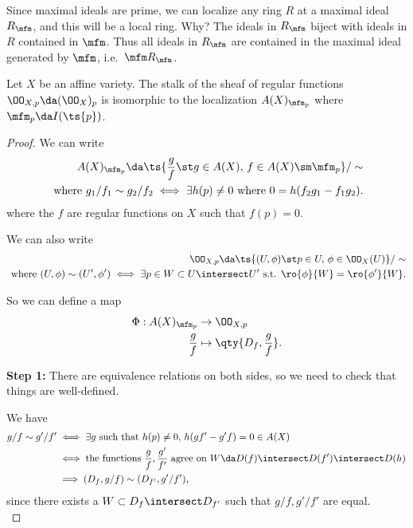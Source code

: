 Since maximal ideals are prime, we can localize any ring \(R\) at a
maximal ideal \(R_\mfm\), and this will be a local ring. Why? The ideals
in \(R_\mfm\) biject with ideals in \(R\) contained in \(\mfm\). Thus
all ideals in \(R_\mfm\) are contained in the maximal ideal generated by
\(\mfm\), i.e.~\(\mfm R_\mfm\).

\begin{lemma}[?]

Let \(X\) be an affine variety. The stalk of the sheaf of regular
functions \(\OO_{X, p} \da (\OO_X)_p\) is isomorphic to the localization
\(A(X)_{\mfm_p}\) where \(\mfm_p \da I(\ts{p})\).

\end{lemma}

\begin{proof}

We can write
\begin{align*}  
A(X)_{\mfm_p} \da \ts{{g\over f} \st g\in A(X),\, f\in A(X)\sm \mfm_p} / \sim \\
\text{ where } g_1/f_1 \sim g_2/f_2 \iff \exists h(p) \neq 0 \text{ where }0 = h(f_2 g_1 - f_1 g_2)
.\end{align*} where the \(f\) are regular functions on \(X\) such that
\(f(p) = 0\).

We can also write
\begin{align*}  
\OO_{X, p} \da \ts{(U, \phi) \st p\in U,\, \phi \in \OO_X(U) } /\sim 
\\ \text{ where } (U, \phi) \sim (U', \phi') 
\iff \exists p\in W \subset U\intersect U' \text{ s.t. } \ro{\phi}{W} = \ro{\phi'}{W}
.\end{align*}

So we can define a map
\begin{align*}  
\Phi: A(X)_{\mfm_p} &\to \OO_{X, p} \\
{g\over f} &\mapsto \qty{D_f, {g\over f}}
.\end{align*}

\textbf{Step 1:} There are equivalence relations on both sides, so we
need to check that things are well-defined.

We have
\begin{align*}  
g/f \sim g'/f' &\iff \exists g \text{ such that } h(p) \neq 0,\, h(gf' - g'f)=0 \in A(X) \\
&\iff \text{the functions } {g\over f}, {g' \over f'} \text{ agree on } W\da D(f) \intersect D(f') \intersect D(h) \\
&\implies (D_f, g/f) \sim (D_{f'}, g'/f')
,\end{align*} since there exists a \(W\subset D_f \intersect D_{f'}\)
such that \(g/f, g'/f'\) are equal.\\


\end{proof}
